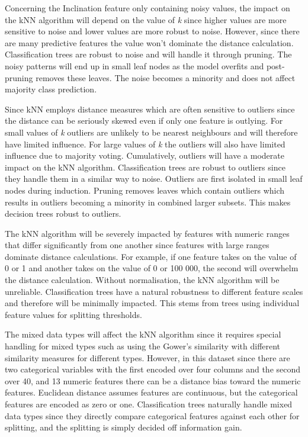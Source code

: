 \documentclass[10pt, conference]{IEEEtran}
\begin{document}
Concerning the Inclination feature only containing noisy values, the impact on the kNN algorithm will depend on the value of \textit{k} since higher values are more sensitive to noise and lower values are more robust to noise. However, since there are many predictive features the value won't dominate the distance calculation. Classification trees are robust to noise and will handle it through pruning. The noisy patterns will end up in small leaf nodes as the model overfits and post-pruning removes these leaves. The noise becomes a minority and does not affect majority class prediction.

Since kNN employs distance measures which are often sensitive to outliers since the distance can be seriously skewed even if only one feature is outlying. For small values of \textit{k} outliers are unlikely to be nearest neighbours and will therefore have limited influence. For large values of \textit{k} the outliers will also have limited influence due to majority voting. Cumulatively, outliers will have a moderate impact on the kNN algorithm. Classification trees are robust to outliers since they handle them in a similar way to noise. Outliers are first isolated in small leaf nodes during induction. Pruning removes leaves which contain outliers which results in outliers becoming a minority in combined larger subsets. This makes decision trees robust to outliers.

The kNN algorithm will be severely impacted by features with numeric ranges that differ significantly from one another since features with large ranges dominate distance calculations. For example, if one feature takes on the value of 0 or 1 and another takes on the value of 0 or 100 000, the second will overwhelm the distance calculation. Without normalisation, the kNN algorithm will be unreliable. Classification trees have a natural robustness to different feature scales and therefore will be minimally impacted. This stems from trees using individual feature values for splitting thresholds.

The mixed data types will affect the kNN algorithm since it requires special handling for mixed types such as using the Gower's similarity with different similarity measures for different types. However, in this dataset since there are two categorical variables with the first encoded over four columns and the second over 40, and 13 numeric features there can be a distance bias toward the numeric features. Euclidean distance assumes features are continuous, but the categorical features are encoded as zero or one. Classification trees naturally handle mixed data types since they directly compare categorical features against each other for splitting, and the splitting is simply decided off information gain.
\end{document}
